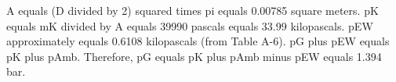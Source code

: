 A equals (D divided by 2) squared times pi equals 0.00785 square meters.  
pK equals mK divided by A equals 39990 pascals equals 33.99 kilopascals.  
pEW approximately equals 0.6108 kilopascals (from Table A-6).  
pG plus pEW equals pK plus pAmb.  
Therefore, pG equals pK plus pAmb minus pEW equals 1.394 bar.